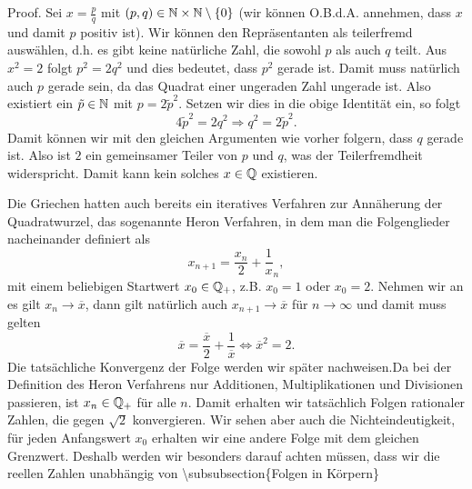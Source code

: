 \begin{emphBox}{}{}
Proof.  Sei \(x = \frac{p}q\) mit \((p,q) \in \mathbb{N} \times \mathbb{N} \setminus \{0\}\) (wir können O.B.d.A. annehmen, dass \(x\) und damit \(p\) positiv ist). Wir können den Repräsentanten als teilerfremd auswählen, d.h. es gibt keine natürliche Zahl, die sowohl \(p\) als auch \(q\) teilt. Aus \(x^2 =2\) folgt \(p^2 = 2 q^2\) und dies bedeutet, dass \(p^2\) gerade ist. Damit muss natürlich auch \(p\) gerade sein, da das Quadrat einer ungeraden Zahl ungerade ist. Also existiert ein \(\tilde p \in \mathbb{N}\) mit \(p = 2 \tilde p^2\). Setzen wir dies in die obige Identität ein, so folgt
\begin{equation*}
 4 \tilde p^2 = 2 q^2 \Rightarrow q^2 = 2 \tilde p^2.
\end{equation*}
Damit können wir mit den gleichen Argumenten wie vorher folgern, dass \(q\) gerade ist. Also ist \(2\) ein gemeinsamer Teiler von \(p\) und \(q\), was der Teilerfremdheit widerspricht. Damit kann kein solches \(x \in \mathbb{Q}\) existieren.

Die Griechen hatten auch bereits ein iteratives Verfahren zur Annäherung der Quadratwurzel, das sogenannte Heron Verfahren, in dem man die Folgenglieder nacheinander definiert als
\begin{equation*}
 x_{n+1}=\frac{x_n}2 + \frac{1}x_n,
\end{equation*}
mit einem beliebigen Startwert \(x_0 \in \mathbb{Q}_+\), z.B. \(x_0=1\) oder \(x_0=2\). Nehmen wir an es gilt \(x_n \rightarrow \overline{x}\), dann gilt natürlich auch \( x_{n+1} \rightarrow \overline{x}\) für \(n\rightarrow \infty\) und damit muss gelten
\begin{equation*}
 \overline{x}=\frac{\overline{x}}2 + \frac{1}{\overline{x}} \Leftrightarrow \overline{x}^2=2.
\end{equation*}
Die tatsächliche Konvergenz der Folge werden wir später nachweisen.Da bei der Definition des Heron Verfahrens nur Additionen, Multiplikationen und Divisionen passieren, ist \(x_n \in \mathbb{Q}_+\) für alle \(n\). Damit erhalten wir tatsächlich Folgen rationaler Zahlen, die gegen \(\sqrt{2}\) konvergieren. Wir sehen aber auch die Nichteindeutigkeit, für jeden Anfangswert \(x_0\) erhalten wir eine andere Folge mit dem gleichen Grenzwert. Deshalb werden wir besonders darauf achten müssen, dass wir die reellen Zahlen unabhängig von
\textbackslash{}subsubsection\{Folgen in Körpern\}
\label{grundlagen/zahlensysteme:definition-13}
\begin{definition}{}{}




\end{definition}
\end{emphBox}
